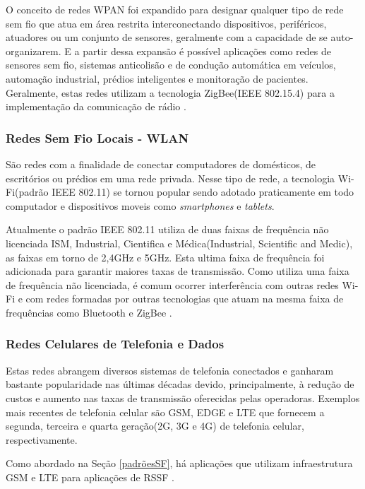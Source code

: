 O conceito de redes WPAN foi expandido para designar qualquer tipo de rede sem fio que atua em área restrita interconectando dispositivos, periféricos, atuadores ou um conjunto de sensores, geralmente com a capacidade de se auto-organizarem. E a partir dessa expansão é possível aplicações como redes de sensores sem fio, sistemas anticolisão e de condução automática em veículos, automação industrial, prédios inteligentes e monitoração de pacientes. Geralmente, estas redes utilizam a tecnologia ZigBee(IEEE 802.15.4) para a implementação da comunicação de rádio \cite{rochol2018sistemas}.

\subsubsection*{Redes Sem Fio Locais - WLAN}
São redes com a finalidade de conectar computadores de domésticos, de escritórios ou prédios em uma rede privada. Nesse tipo de rede, a tecnologia Wi-Fi(padrão IEEE 802.11) se tornou popular sendo adotado praticamente em todo computador e dispositivos moveis como \emph{smartphones} e \emph{tablets}.

Atualmente o padrão IEEE 802.11 utiliza de duas faixas de frequência não licenciada ISM, Industrial, Cientifica e Médica(Industrial, Scientific and Medic), as faixas em torno de 2,4GHz e 5GHz. Esta ultima faixa de frequência foi adicionada para garantir maiores taxas de transmissão. Como utiliza uma faixa de frequência não licenciada, é comum ocorrer interferência com outras redes Wi-Fi e com redes formadas por outras tecnologias que atuam na mesma faixa de frequências como Bluetooth e ZigBee \cite{rochol2018sistemas}.

\subsubsection*{Redes Celulares de Telefonia e Dados}
Estas redes abrangem diversos sistemas de telefonia conectados e ganharam bastante popularidade nas últimas décadas devido, principalmente, à redução de custos e aumento nas taxas de transmissão oferecidas pelas operadoras. Exemplos mais recentes de telefonia celular são GSM, EDGE e LTE que fornecem a segunda, terceira e quarta geração(2G, 3G e 4G) de telefonia celular, respectivamente.

Como abordado na Seção \ref{padrõesSF}, há aplicações que utilizam infraestrutura GSM e LTE para aplicações de RSSF \cite{rochol2018sistemas}.


